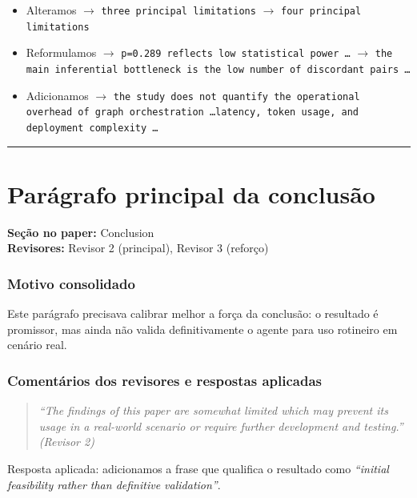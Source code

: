 \documentclass[11pt,a4paper]{article}
\begin{document}
\begin{trackblock}
\begin{itemize}
  \item Alteramos $\to$ \texttt{three principal limitations} $\to$ \texttt{four principal limitations}
  \item Reformulamos $\to$ \texttt{p=0.289 reflects low statistical power \ldots} $\to$ \texttt{the main inferential bottleneck is the low number of discordant pairs \ldots}
  \item Adicionamos $\to$ \texttt{the study does not quantify the operational overhead of graph orchestration \ldots latency, token usage, and deployment complexity \ldots}
\end{itemize}
\end{trackblock}

\bigskip\hrule\bigskip

\section{Parágrafo principal da conclusão}

\textbf{Seção no paper:} Conclusion\\
\textbf{Revisores:} Revisor 2 (principal), Revisor 3 (reforço)

\subsubsection*{Motivo consolidado}

Este parágrafo precisava calibrar melhor a força da conclusão: o resultado é promissor, mas ainda não valida definitivamente o agente para uso rotineiro em cenário real.

\subsubsection*{Comentários dos revisores e respostas aplicadas}

\begin{quote}
\textit{``The findings of this paper are somewhat limited which may prevent its usage in a real-world scenario or require further development and testing.''}
\hfill\textit{(Revisor 2)}
\end{quote}

\noindent Resposta aplicada: adicionamos a frase que qualifica o resultado como \textit{``initial feasibility rather than definitive validation''}.
\end{document}
